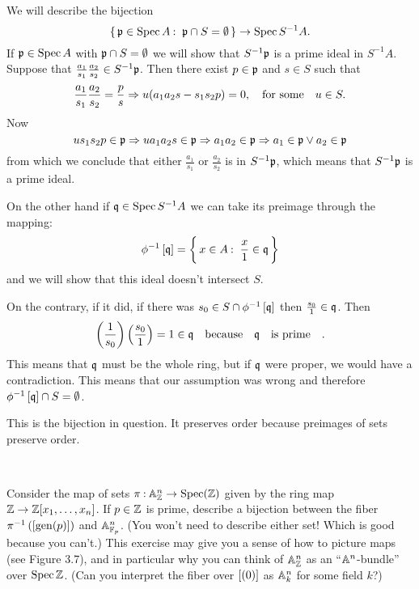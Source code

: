 \documentclass[12pt]{memoir}
\begin{document}
\begin{ptcbr}
   We will describe the bijection 
   $$\{\,\mathfrak{p}\in\operatorname{Spec} A\mathbin{:}\ \mathfrak{p}\cap S=\emptyset\,\}\to\operatorname{Spec} S^{-1}A.$$
   If $\mathfrak{p}\in\operatorname{Spec} A$ with $\mathfrak{p}\cap S=\emptyset$ we will show that $S^{-1}\mathfrak{p}$ is a prime ideal in $S^{-1}A$. Suppose that $\frac{a_1}{s_1}\frac{a_2}{s_2}\in S^{-1}\mathfrak{p}$. Then there exist $p\in\mathfrak{p}$ and $s\in S$ such that 
   $$\frac{a_1}{s_1}\frac{a_2}{s_2}=\frac{p}{s}\Rightarrow u(a_1a_2s-s_1s_2p)=0,\quad\text{for some}\quad u\in S.$$
   Now 
   $$us_1s_2p\in\mathfrak{p}\Rightarrow ua_1a_2s\in\mathfrak{p}\Rightarrow a_1a_2\in\mathfrak{p}\Rightarrow a_1\in\mathfrak{p}\lor a_2\in\mathfrak{p}$$
   from which we conclude that either $\frac{a_1}{s_1}$ or $\frac{a_2}{s_2}$ is in $S^{-1}\mathfrak{p}$, which means that $S^{-1}\mathfrak{p}$ is a prime ideal.\par 
   On the other hand if $\mathfrak{q}\in\operatorname{Spec} S^{-1}A$ we can take its preimage through the mapping:
   $$\phi^{-1}\left\lbrack\mathfrak{q}\right\rbrack=\biggl\{\,x\in A\mathbin{:}\ \frac x1\in\mathfrak{q}\,\biggr\}$$ 
   and we will show that this ideal doesn't intersect $S$.\par 
   On the contrary, if it did, if there was $s_0\in S\cap\phi^{-1}\left\lbrack\mathfrak{q}\right\rbrack$ then $\frac{s_0}{1}\in\mathfrak{q}$. Then 
   $$\left(\frac{1}{s_0}\right)\left(\frac{s_0}{1}\right)=1\in\mathfrak{q}\quad\text{because}\quad\mathfrak{q}\quad\text{is prime}\quad.$$
   This means that $\mathfrak{q}$ must be the whole ring, but if $\mathfrak{q}$ were proper, we would have a contradiction. This means that our assumption was wrong and therefore $\phi^{-1}\left\lbrack\mathfrak{q}\right\rbrack\cap S=\emptyset$.\par 
   This is the bijection in question. It preserves order because preimages of sets preserve order.
\end{ptcbr}
\
\begin{Ej}[3.2.Q Vakil]
    Consider the map of sets $\pi\mathbin{:}\mathbb{A}^n_{\mathbb{Z}}\to\operatorname{Spec}(\mathbb{Z})$
given by the ring map $\mathbb{Z}\to\mathbb{Z}[x_1,\dots,x_n]$. If $p\in\mathbb{Z}$ is prime, describe a bijection between the fiber $\pi^{-1}\left(\left\lbrack\operatorname{gen}(p)\right\rbrack\right)$ and $\mathbb{A}_{\mathbb{F}_p}^n$. (You won't need to describe either set! Which is good because you can't.) This exercise may give you a sense of how to picture maps (see Figure 3.7), and in particular why you can think of $\mathbb{A}^n_{\mathbb{Z}}$ as an “$\mathbb{A}^n$-bundle” over $\operatorname{Spec}\mathbb{Z}$. (Can you interpret the fiber over $\left\lbrack(0)\right\rbrack$ as $\mathbb{A}^n_k$ for some field $k$?)
\end{Ej}

\begin{ptcbr}

\end{ptcbr}
\end{document}
